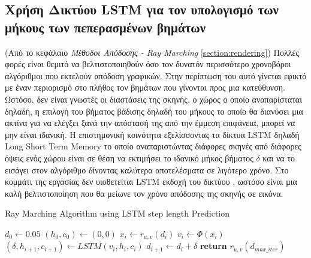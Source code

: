 \begin{appendices}
        \subsection*{Χρήση Δικτύου LSTM για τον υπολογισμό των μήκους των πεπερασμένων βημάτων}
            (Από το κεφάλαιο \textit{Μέθοδοι Απόδοσης - Ray Marching} \ref{section:rendering})
            Πολλές φορές είναι θεμιτό να βελτιστοποιηθούν όσο τον δυνατόν περισσότερο χρονοβόροι αλγόριθμοι που εκτελούν απόδοση γραφικών. Στην περίπτωση του  αυτό γίνεται εφικτό με έναν περιορισμό στο πλήθος τον βημάτων που γίνονται προς μια κατεύθυνση. Ωστόσο, δεν είναι γνωστές οι διαστάσεις της σκηνής, ο χώρος ο οποίο αναπαρίσταται δηλαδή, η επιλογή του βήματος βάδισης δηλαδή του μήκους το οποίο θα διανύσει μια ακτίνα για να ελέγξει ξανά την απόστασή της από την έμμεση επιφάνεια, μπορεί να μην είναι ιδανική. Η επιστημονική κοινότητα εξελίσσοντας τα δίκτυα LSTM δηλαδή Long Short Term Memory το οποίο αναπαριστώντας διάφορες σκηνές από διάφορες όψεις ενός χώρου είναι σε θέση να εκτιμήσει το ιδανικό μήκος βήματος $\delta$ και να το εισάγει στον αλγόριθμο δίνοντας καλύτερα αποτελέσματα σε λιγότερο χρόνο. Στο κομμάτι της εργασίας δεν υιοθετείται LSTM εκδοχή του δικτύου , ωστόσο είναι μια καλή βελτιστοποίηση που θα μείωνε τον χρόνο απόδοσης της σκηνής σε εικόνα.
            \begin{algorithm}[ht]
            \caption{Ray Marching Algorithm using LSTM step length Prediction}
            \begin{algorithmic}
            \State $d_0 \gets 0.05$ 
            \State $(h_0, c_0) \gets (0, 0)$ 
                \State $x_i \gets r_{u,v}(d_i)$ 
                \State $v_i \gets \Phi(x_i)$ 
                \State $(\delta, h_{i+1}, c_{i+1}) \gets LSTM(v_i, h_i, c_i)$ 
                \State $d_{i+1} \gets d_i + \delta$ 
            \EndFor
            \State \textbf{return} $r_{u,v}(d_{max\_iter})$
            \EndFunction
            \end{algorithmic}
            \end{algorithm}
            \newline
            \clearpage

\end{appendices}
